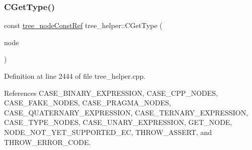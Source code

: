\subsubsection{\texorpdfstring{C\+Get\+Type()}{CGetType()}}
{\footnotesize\ttfamily const \hyperlink{tree__node_8hpp_a3cf5d02292c940f3892425a5b5fdec3c}{tree\+\_\+node\+Const\+Ref} tree\+\_\+helper\+::\+C\+Get\+Type (\begin{DoxyParamCaption}\item[{const \hyperlink{tree__node_8hpp_a3cf5d02292c940f3892425a5b5fdec3c}{tree\+\_\+node\+Const\+Ref}}]{node }\end{DoxyParamCaption})\hspace{0.3cm}{\ttfamily [static]}}



Definition at line 2444 of file tree\+\_\+helper.\+cpp.



References C\+A\+S\+E\+\_\+\+B\+I\+N\+A\+R\+Y\+\_\+\+E\+X\+P\+R\+E\+S\+S\+I\+ON, C\+A\+S\+E\+\_\+\+C\+P\+P\+\_\+\+N\+O\+D\+ES, C\+A\+S\+E\+\_\+\+F\+A\+K\+E\+\_\+\+N\+O\+D\+ES, C\+A\+S\+E\+\_\+\+P\+R\+A\+G\+M\+A\+\_\+\+N\+O\+D\+ES, C\+A\+S\+E\+\_\+\+Q\+U\+A\+T\+E\+R\+N\+A\+R\+Y\+\_\+\+E\+X\+P\+R\+E\+S\+S\+I\+ON, C\+A\+S\+E\+\_\+\+T\+E\+R\+N\+A\+R\+Y\+\_\+\+E\+X\+P\+R\+E\+S\+S\+I\+ON, C\+A\+S\+E\+\_\+\+T\+Y\+P\+E\+\_\+\+N\+O\+D\+ES, C\+A\+S\+E\+\_\+\+U\+N\+A\+R\+Y\+\_\+\+E\+X\+P\+R\+E\+S\+S\+I\+ON, G\+E\+T\+\_\+\+N\+O\+DE, N\+O\+D\+E\+\_\+\+N\+O\+T\+\_\+\+Y\+E\+T\+\_\+\+S\+U\+P\+P\+O\+R\+T\+E\+D\+\_\+\+EC, T\+H\+R\+O\+W\+\_\+\+A\+S\+S\+E\+RT, and T\+H\+R\+O\+W\+\_\+\+E\+R\+R\+O\+R\+\_\+\+C\+O\+DE.



